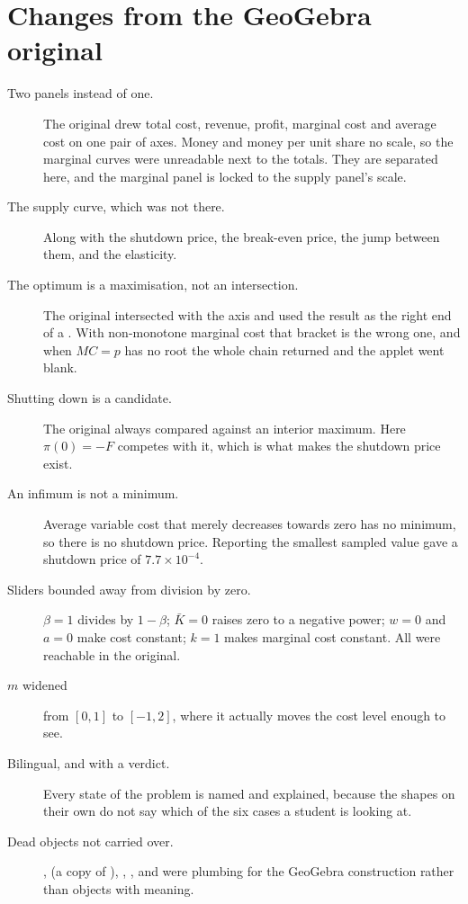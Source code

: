 \documentclass[11pt,a4paper]{appletmanual}
\begin{document}
\section{Changes from the GeoGebra original}

\begin{description}
\item[Two panels instead of one.] The original drew total cost, revenue,
  profit, marginal cost and average cost on one pair of axes. Money and money
  per unit share no scale, so the marginal curves were unreadable next to the
  totals. They are separated here, and the marginal panel is locked to the
  supply panel's scale.
\item[The supply curve, which was not there.] Along with the shutdown price,
  the break-even price, the jump between them, and the elasticity.
\item[The optimum is a maximisation, not an intersection.] The original
  intersected  with the axis and used the result as the
  right end of a . With non-monotone marginal
  cost that bracket is the wrong one, and when $MC = p$ has no root the whole
  chain returned  and the applet went blank.
\item[Shutting down is a candidate.] The original always compared against an
  interior maximum. Here $\pi(0) = -F$ competes with it, which is what makes
  the shutdown price exist.
\item[An infimum is not a minimum.] Average variable cost that merely decreases
  towards zero has no minimum, so there is no shutdown price. Reporting the
  smallest sampled value gave a shutdown price of $7.7\times10^{-4}$.
\item[Sliders bounded away from division by zero.] $\beta = 1$ divides by
  $1-\beta$; $\bar K = 0$ raises zero to a negative power; $w = 0$ and $a = 0$
  make cost constant; $k = 1$ makes marginal cost constant. All were reachable
  in the original.
\item[$m$ widened] from $[0, 1]$ to $[-1, 2]$, where it actually moves the cost
  level enough to see.
\item[Bilingual, and with a verdict.] Every state of the problem is named and
  explained, because the shapes on their own do not say which of the six cases
  a student is looking at.
\item[Dead objects not carried over.] ,  (a copy of
  ), , ,  and  were
  plumbing for the GeoGebra construction rather than objects with meaning.
\end{description}
\end{document}
